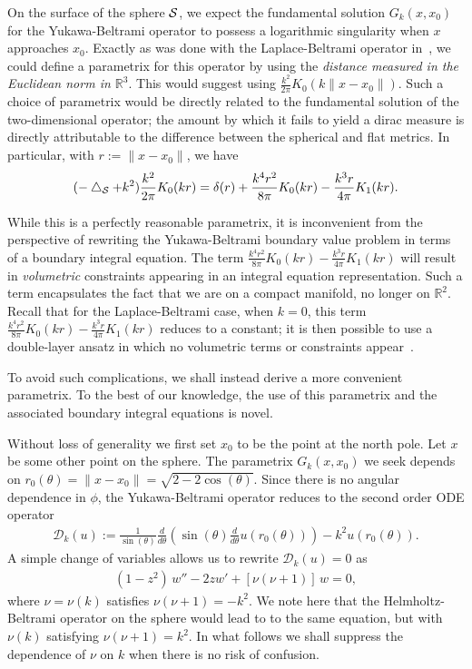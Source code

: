 On the surface of the sphere $\S$, we expect the fundamental solution
$G_k(x,x_{0})$ for the Yukawa-Beltrami operator to possess a
logarithmic singularity when $x$ approaches $x_{0}$. Exactly as was
done  with the Laplace-Beltrami operator in~\cite{gemmrich}, we could
define a parametrix for this operator by using the {\it distance
measured in the Euclidean norm in $\mathbb{R}^3$}. This would suggest
using $ \frac{k^2}{2\pi}K_0(k\|x-x_{0}\|)$.  Such a choice of
parametrix would be directly related to the fundamental solution of the
two-dimensional operator; the amount by which it fails to yield a dirac
measure is directly attributable to the difference between the
spherical and flat metrics.  In particular, with $r:=\|x-x_{0}\|$, we
have
\begin{align*}
  (-\lap_{\S} + k^{2})\frac{k^2}{2\pi}K_0(kr) = \delta(r) 
  +\frac{k^{4}r^{2}}{8\pi}K_{0}(kr) - \frac{k^{3}r}{4\pi}K_{1}(kr).
\end{align*}

While this is a perfectly reasonable parametrix, it is inconvenient
from the perspective of rewriting the Yukawa-Beltrami boundary value
problem in terms of a boundary integral equation. The term
$\frac{k^{4}r^{2}}{8\pi}K_{0}(kr) - \frac{k^{3}r}{4\pi}K_{1}(kr)$ will
result in {\it volumetric} constraints  appearing in an integral
equation representation. Such a term encapsulates the fact that we are
on a compact manifold, no longer on $\mathbb{R}^2$. Recall that for the
Laplace-Beltrami case, when $k=0$, this term
$\frac{k^{4}r^{2}}{8\pi}K_{0}(kr) - \frac{k^{3}r}{4\pi}K_{1}(kr)$
reduces to a constant; it is then possible to use a double-layer ansatz
in which no volumetric terms or constraints appear~\cite{kro:nig2013}.  

To avoid such complications, we shall instead derive a more convenient
parametrix. To the best of our knowledge, the use of this parametrix
and the associated boundary integral equations is novel. 

Without loss of generality we first set $x_{0}$ to be the point at the
north pole.  Let $x$ be some other point on the sphere. The parametrix
$G_k(x,x_0)$ we seek depends on
$r_0(\theta)=\|x-x_0\|=\sqrt{2-2\cos(\theta)}$. Since there is no
angular dependence in $\phi$, the Yukawa-Beltrami operator reduces to
the second order ODE operator
\begin{align*}
  \mathcal{D}_k(u) := \frac{1}{\sin(\theta)}
  \frac{d}{d\theta}\left(\sin(\theta)
  \frac{d}{d\theta}u(r_0(\theta))\right)-k^2 u(r_{0}(\theta)).
\end{align*}
A simple change of variables allows us to rewrite $\mathcal{D}_k (u)=0$
as 
\begin{align}
  (1-z^2)\,w'' -2zw' + \left[\nu(\nu+1)\right]\,w = 0,
  \label{LegendrePequation}
\end{align}
where $\nu = \nu(k)$ satisfies $\nu(\nu + 1) = -k^2$. We note here that
the Helmholtz-Beltrami operator on the sphere would lead to to the same
equation, but with $\nu(k)$ satisfying $\nu(\nu+1)=k^{2}$. In what
follows we shall suppress the dependence of $\nu$ on $k$ when there is
no risk of confusion.

